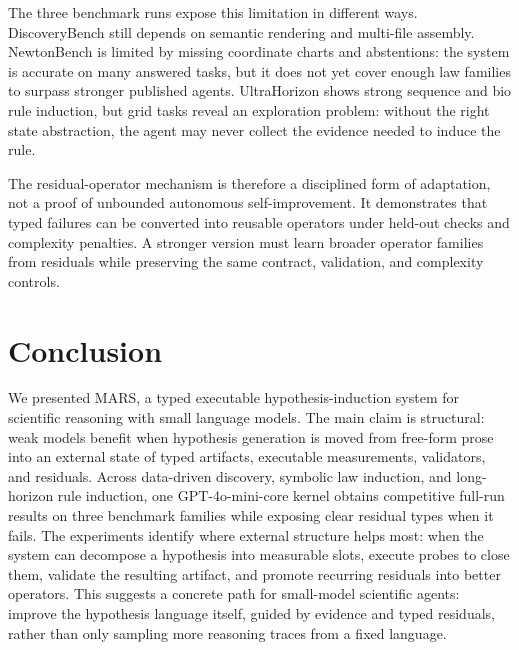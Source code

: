 \documentclass[letterpaper]{article}
\newcommand{\mars}{\textsc{MARS}\xspace}
\newcommand{\gptmini}{GPT-4o-mini\xspace}
\begin{document}
The three benchmark runs expose this limitation in different ways.
DiscoveryBench still depends on semantic rendering and multi-file assembly.
NewtonBench is limited by missing coordinate charts and abstentions: the system
is accurate on many answered tasks, but it does not yet cover enough law
families to surpass stronger published agents. UltraHorizon shows strong
sequence and bio rule induction, but grid tasks reveal an exploration problem:
without the right state abstraction, the agent may never collect the evidence
needed to induce the rule.

The residual-operator mechanism is therefore a disciplined form of adaptation,
not a proof of unbounded autonomous self-improvement. It demonstrates that
typed failures can be converted into reusable operators under held-out checks
and complexity penalties. A stronger version must learn broader operator
families from residuals while preserving the same contract, validation, and
complexity controls.

\section{Conclusion}

We presented \mars, a typed executable hypothesis-induction system for
scientific reasoning with small language models. The main claim is structural:
weak models benefit when hypothesis generation is moved from free-form prose
into an external state of typed artifacts, executable measurements, validators,
and residuals. Across data-driven discovery, symbolic law induction, and
long-horizon rule induction, one \gptmini-core kernel obtains competitive
full-run results on three benchmark families while exposing clear residual
types when it fails. The experiments identify where external structure helps
most: when the system can decompose a hypothesis into measurable slots, execute
probes to close them, validate the resulting artifact, and promote recurring
residuals into better operators. This suggests a concrete path for small-model
scientific agents: improve the hypothesis language itself, guided by evidence
and typed residuals, rather than only sampling more reasoning traces from a
fixed language.
\end{document}
